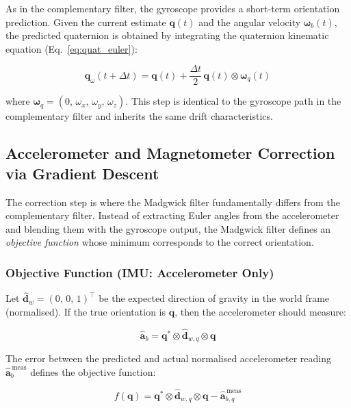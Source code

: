 As in the complementary filter, the gyroscope provides a short-term
orientation prediction.  Given the current estimate $\mathbf{q}(t)$ and the
angular velocity $\boldsymbol{\omega}_b(t)$, the predicted quaternion is
obtained by integrating the quaternion kinematic equation
(Eq.~\ref{eq:quat_euler}):

\begin{equation}
  \mathbf{q}_{\omega}(t + \Delta t)
  = \mathbf{q}(t)
    + \frac{\Delta t}{2}\,\mathbf{q}(t) \otimes \boldsymbol{\omega}_q(t)
  \label{eq:madg_gyro}
\end{equation}

\noindent where $\boldsymbol{\omega}_q = (0,\, \omega_x,\, \omega_y,\,
\omega_z)$.  This step is identical to the gyroscope path in the
complementary filter and inherits the same drift characteristics.

\subsection{Accelerometer and Magnetometer Correction via Gradient Descent}
\label{sec:madg:gradient}

The correction step is where the Madgwick filter fundamentally differs from
the complementary filter.  Instead of extracting Euler angles from the
accelerometer and blending them with the gyroscope output, the Madgwick
filter defines an \emph{objective function} whose minimum corresponds to the
correct orientation.

\subsubsection{Objective Function (IMU: Accelerometer Only)}

Let $\hat{\mathbf{d}}_w = (0,\, 0,\, 1)^\top$ be the expected direction of
gravity in the world frame (normalised).  If the true orientation is
$\mathbf{q}$, then the accelerometer should measure:

\begin{equation}
  \hat{\mathbf{a}}_b = \mathbf{q}^* \otimes \hat{\mathbf{d}}_{w,q}
                       \otimes \mathbf{q}
  \label{eq:expected_accel}
\end{equation}

\noindent The error between the predicted and actual normalised accelerometer
reading $\hat{\mathbf{a}}_b^{\,\text{meas}}$ defines the objective function:

\begin{equation}
  f(\mathbf{q})
  = \mathbf{q}^* \otimes \hat{\mathbf{d}}_{w,q} \otimes \mathbf{q}
    - \hat{\mathbf{a}}_{b,q}^{\,\text{meas}}
  \label{eq:objective}
\end{equation}

